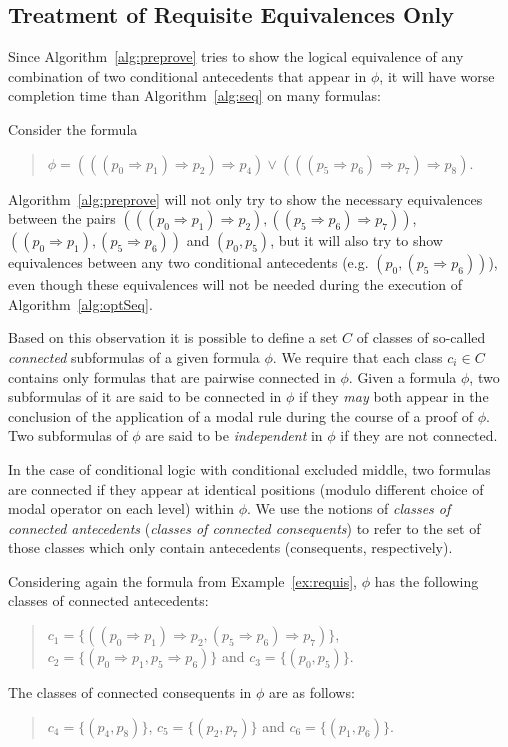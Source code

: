 \documentclass{entcs} \usepackage{entcsmacro}
\begin{document}
\subsection{Treatment of Requisite Equivalences Only}

Since Algorithm~\ref{alg:preprove} tries to show the logical equivalence of any combination
of two conditional antecedents that appear in $\phi$, it will have worse completion
time than Algorithm~\ref{alg:seq} on many formulas:

\begin{example}
Consider the formula 
\begin{quote}
$\phi=(((p_0\Rightarrow p_1)\Rightarrow p_2)\Rightarrow p_4)\vee
(((p_5\Rightarrow p_6)\Rightarrow p_7)\Rightarrow p_8)$.
\end{quote}
Algorithm~\ref{alg:preprove} will not only
try to show the necessary equivalences between the pairs
$(((p_0\Rightarrow p_1)\Rightarrow p_2), ((p_5\Rightarrow p_6)\Rightarrow p_7))$,
$((p_0\Rightarrow p_1), (p_5\Rightarrow p_6))$ and $(p_0,p_5)$, but it will
also try to show equivalences between any two conditional antecedents (e.g. $(p_0,
(p_5\Rightarrow p_6))$), even though these equivalences will not be needed
during the execution of Algorithm~\ref{alg:optSeq}.
\label{ex:requis}
\end{example}

Based on this observation it is possible to define a set $C$ of classes
of so-called \emph{connected} subformulas of a given formula $\phi$. We require that
each class $c_i\in C$ contains only formulas that are pairwise connected in $\phi$. Given
a formula $\phi$, two subformulas of it are said to be connected in $\phi$ if they \emph{may}
both appear in the conclusion of the application of a modal rule during the course of a proof
of $\phi$. Two subformulas of $\phi$ are said to be \emph{independent} in $\phi$ if they are
not connected.


In the case of conditional logic with conditional excluded middle, two formulas are connected
if they appear at identical positions (modulo different choice of modal operator on each level)
within $\phi$. We use the notions of \emph{classes of connected antecedents} (\emph{classes of
connected consequents}) to refer to the set of those classes which only contain antecedents (consequents,
respectively). 

\begin{example}
Considering again the formula from Example~\ref{ex:requis}, $\phi$ has the following classes
of connected antecedents:
\begin{quote}
$c_1=\{((p_0\Rightarrow p_1)\Rightarrow p_2, (p_5\Rightarrow p_6)\Rightarrow p_7)\}$,
$c_2=\{(p_0\Rightarrow p_1, p_5\Rightarrow p_6)\}$ and $c_3=\{(p_0,p_5)\}$.
\end{quote}
The classes of connected consequents in $\phi$ are as follows:
\begin{quote}
$c_4=\{(p_4, p_8)\}$, $c_5=\{(p_2, p_7)\}$ and $c_6=\{(p_1, p_6)\}$.
\end{quote}
\end{example}
\end{document}
